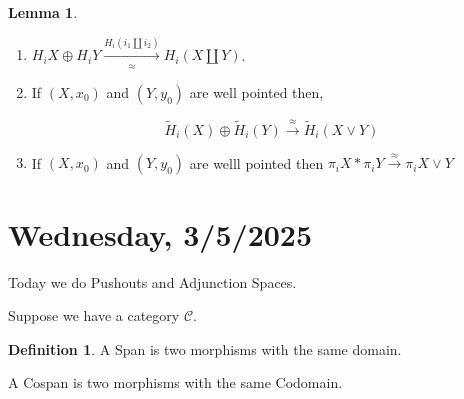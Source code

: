 \documentclass{article}
\theoremstyle{definition}
\newtheorem*{definition}{Definition}
\newtheorem{lemma}[theorem]{Lemma}
\begin{document}
    \begin{lemma}
        \begin{enumerate}[label=\alph*)]
            \item \(H_i X \oplus H_i Y \xrightarrow[\approx]{H_i(i_1 \coprod i_2)} H_i (X \coprod Y)\).
            \item If \((X,x_0)\) and \((Y,y_0)\) are well pointed then,
            
            \[
                \widetilde{H}_i(X) \oplus \widetilde{H}_i(Y) \xrightarrow{\approx} \widetilde{H}_i(X \vee Y)
            \]
            \item If \((X,x_0)\) and \((Y,y_0)\) are welll pointed then \(\pi_i X \ast \pi_i Y \xrightarrow{\approx} \pi_i X \vee Y\)
        \end{enumerate} 
    \end{lemma}

    \section*{Wednesday, 3/5/2025}
    
    Today we do Pushouts and Adjunction Spaces.

    Suppose we have a category \(\mathcal{C}\).

    \begin{definition}
        A Span is two morphisms with the same domain.

        \begin{center}
        \end{center}

        A Cospan is two morphisms with the same Codomain.

        \begin{center}
        \end{center}
    \end{definition}
\end{document}
